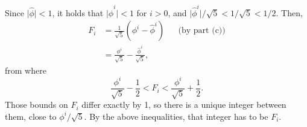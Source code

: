 Since $\bigl|\widehat\phi\bigr|<1$, it holds that $\bigl|\widehat\phi^i\bigr|<1$ for $i>0$, and $\bigl|\widehat\phi^i\bigr|/\!\sqrt{5}<1/\!\sqrt{5}<1/2$.
Then,
\begin{align*}
    F_i &= \frac{1}{\sqrt{5}}(\phi^i-\widehat\phi^i) && \text{(by part (c))} \\
    &= \frac{\phi^i}{\sqrt{5}}-\frac{\widehat\phi^i}{\sqrt{5}},
\end{align*}
from where
\[
	\frac{\phi^i}{\sqrt{5}}-\frac{1}{2} < F_i < \frac{\phi^i}{\sqrt{5}}+\frac{1}{2}.
\]
Those bounds on $F_i$ differ exactly by 1, so there is a unique integer between them, close to $\phi^i/\sqrt{5}$.
By the above inequalities, that integer has to be $F_i$.
